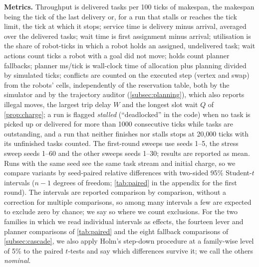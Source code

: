 \noindent\textbf{Metrics.}
Throughput is delivered tasks per 100 ticks of makespan, the makespan being
the tick of the last delivery or, for a run that stalls or reaches the tick
limit, the tick at which it stops; service time is delivery minus arrival,
averaged over the delivered tasks; wait time is first assignment minus arrival;
utilisation is the share of robot-ticks in which a robot holds an assigned,
undelivered task; wait actions count
ticks a robot with a goal did not move; holds count planner fallbacks; planner
ms/tick is wall-clock time of allocation plus planning divided by simulated
ticks; conflicts are counted on the executed step (vertex and swap) from the
robots' cells, independently of the reservation table, both by the simulator
and by the trajectory auditor (\cref{subsec:planning}), which also reports
illegal moves, the largest trip delay $W$ and the longest slot wait $Q$ of
\cref{prop:charge}; a run is flagged \emph{stalled} (``deadlocked'' in the
code) when no task is picked up or delivered for more than 1000 consecutive ticks
while tasks are outstanding, and a run that neither finishes nor stalls stops
at 20{,}000 ticks with its unfinished tasks counted. The first-round sweeps
use seeds 1--5, the stress sweep seeds 1--60 and the other
sweeps seeds 1--30; results are reported as mean. Runs with the
same seed see the same task stream and initial charge, so we compare
variants by seed-paired relative differences with two-sided 95\%
Student-$t$ intervals ($n-1$ degrees of freedom; \cref{tab:paired} in the
appendix for the first round). The intervals are reported comparison by
comparison, without a correction for multiple comparisons, so among many
intervals a few are expected to exclude zero by chance; we say so where we
count exclusions. For the two families in which we read individual intervals
as effects, the fourteen lever and planner comparisons of \cref{tab:paired}
and the eight fallback comparisons of \cref{subsec:cascade}, we also apply
Holm's step-down procedure at a family-wise level of 5\% to the paired
$t$-tests and say which differences survive it; we call the others
\emph{nominal}.

